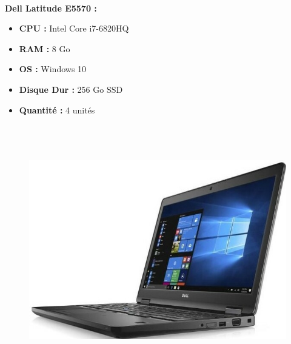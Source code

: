 \documentclass[11pt,a4paper,oneside]{article}
\begin{document}
\paragraph{}\textbf{Dell Latitude E5570 :} \\
\begin{itemize}
\item \textbf{CPU :} Intel Core i7-6820HQ
\item \textbf{RAM :} 8 Go
\item \textbf{OS :} Windows 10
\item \textbf{Disque Dur :} 256 Go SSD
\item \textbf{Quantité :} 4 unités
\\ \\ \\ \\
\end{itemize}
\begin{figure}
\includegraphics[scale=0.4]{Ressources/Materiel/L5580.jpg}\vspace{-2cm}
\end{figure}
\end{document}
